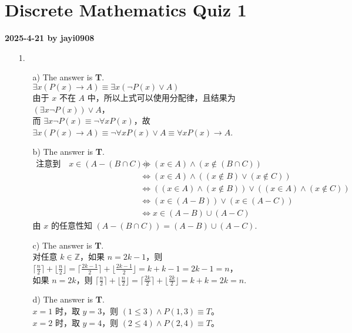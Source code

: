 \documentclass{ctexbook}
\begin{document}
\centering
\section*{Discrete Mathematics Quiz 1}
\centering
\textbf{2025-4-21 by jayi0908}

\begin{enumerate}
    \item[1.]
    \begin{enumerate}
        \item [a)] The answer is \textbf{T}. \\
        $\exists x(P(x)\rightarrow A)\equiv\exists x(\lnot P(x)\lor A)$ \\
        由于 $x$ 不在 $A$ 中，所以上式可以使用分配律，且结果为 $(\exists x\lnot P(x))\lor A$， \\
        而 $\exists x\lnot P(x)\equiv\lnot\forall xP(x)$，故 $\exists x(P(x)\rightarrow A)\equiv\lnot\forall xP(x)\lor A\equiv\forall xP(x)\rightarrow A$. 
        \item [b)] The answer is \textbf{T}.
        \begin{align*} 
        \text{注意到}\quad x\in(A-(B\cap C)) &\Leftrightarrow (x\in A)\land (x\notin (B\cap C)) \\
        & \Leftrightarrow (x\in A)\land ((x\notin B) \lor (x\notin C)) \\
        & \Leftrightarrow ((x\in A)\land(x\notin B))\lor ((x\in A)\land(x\notin C)) \\
        & \Leftrightarrow (x\in (A-B))\lor (x\in (A-C)) \\
        & \Leftrightarrow x\in (A-B)\cup(A-C) 
        \end{align*}
        由 $x$ 的任意性知 $(A-(B\cap C))=(A-B)\cup(A-C)$.
        \item [c)] The answer is \textbf{T}. \\
        对任意 $k\in\mathbb{Z}$，如果 $n=2k-1$，则 $\lceil\frac{n}{2}\rceil+\lfloor\frac{n}{2}\rfloor=\lceil\frac{2k-1}{2}\rceil+\lfloor\frac{2k-1}{2}\rfloor=k+k-1=2k-1=n$，\\
        如果 $n=2k$，则 $\lceil\frac{n}{2}\rceil+\lfloor\frac{n}{2}\rfloor=\lceil\frac{2k}{2}\rceil+\lfloor\frac{2k}{2}\rfloor=k+k=2k=n$.
        \item [d)] The answer is \textbf{T}. \\
        $x=1$ 时，取 $y=3$，则 $(1\leq 3)\land P(1,3)\equiv T$。\\
        $x=2$ 时，取 $y=4$，则 $(2\leq 4)\land P(2,4)\equiv T$。\\

\end{enumerate}
\end{enumerate}
\end{document}
